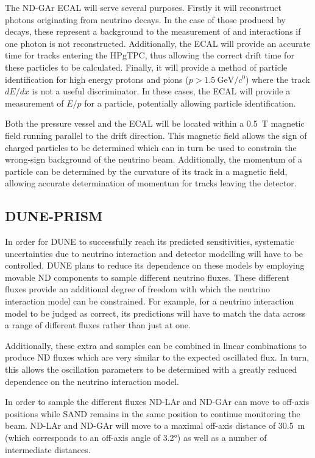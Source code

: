 The ND-GAr ECAL will serve several purposes.
Firstly it will reconstruct photons originating from neutrino decays.
In the case of those produced by \pizero decays, these represent a background to the measurement of \nue and \anue interactions if one photon is not reconstructed.
Additionally, the ECAL will provide an accurate time for tracks entering the HPgTPC, thus allowing the correct drift time for these particles to be calculated.
Finally, it will provide a method of particle identification for high energy protons and pions ($p > \SI{1.5}{\giga\electronvolt\per\clight}$) where the track $dE/dx$ is not a useful discriminator.
In these cases, the ECAL will provide a measurement of $E/p$ for a particle, potentially allowing particle identification.

Both the pressure vessel and the ECAL will be located within a \SI{0.5}{\tesla} magnetic field running parallel to the drift direction.
This magnetic field allows the sign of charged particles to be determined which can in turn be used to constrain the wrong-sign background of the neutrino beam.
Additionally, the momentum of a particle can be determined by the curvature of its track in a magnetic field, allowing accurate determination of momentum for tracks leaving the detector.

\subsection{DUNE-PRISM}
\label{sec:dune:nd:prism}

In order for DUNE to successfully reach its predicted sensitivities, systematic uncertainties due to neutrino interaction and detector modelling will have to be controlled.
DUNE plans to reduce its dependence on these models by employing movable ND components to sample different neutrino fluxes.
These different fluxes provide an additional degree of freedom with which the neutrino interaction model can be constrained.
For example, for a neutrino interaction model to be judged as correct, its predictions will have to match the data across a range of different fluxes rather than just at one. 
 
Additionally, these extra \numu and \anumu samples can be combined in linear combinations to produce ND fluxes which are very similar to the expected oscillated flux.
In turn, this allows the oscillation parameters to be determined with a greatly reduced dependence on the neutrino interaction model. 

In order to sample the different fluxes ND-LAr and ND-GAr can move to off-axis positions while SAND remains in the same position to continue monitoring the beam.
ND-LAr and ND-GAr will move to a maximal off-axis distance of \SI{30.5}{\m} (which corresponds to an off-axis angle of \ang{3.2}) as well as a number of intermediate distances.

